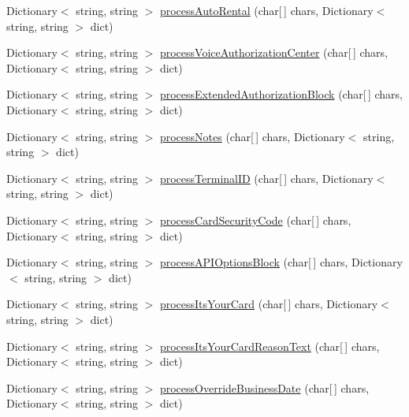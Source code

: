 \begin{DoxyCompactItemize}
\item 
Dictionary$<$ string, string $>$ \mbox{\hyperlink{class_form_sim_1_1_t_c_p_handler_a88eb6a78093ee2835b964fbf66653e7e}{process\+Auto\+Rental}} (char\mbox{[}$\,$\mbox{]} chars, Dictionary$<$ string, string $>$ dict)
\item 
Dictionary$<$ string, string $>$ \mbox{\hyperlink{class_form_sim_1_1_t_c_p_handler_a2c44efe0f4fd809a32174812bd2b7149}{process\+Voice\+Authorization\+Center}} (char\mbox{[}$\,$\mbox{]} chars, Dictionary$<$ string, string $>$ dict)
\item 
Dictionary$<$ string, string $>$ \mbox{\hyperlink{class_form_sim_1_1_t_c_p_handler_aeac1ea5fad517dbb64eae4c3039ea46f}{process\+Extended\+Authorization\+Block}} (char\mbox{[}$\,$\mbox{]} chars, Dictionary$<$ string, string $>$ dict)
\item 
Dictionary$<$ string, string $>$ \mbox{\hyperlink{class_form_sim_1_1_t_c_p_handler_ad4d752f756499196f766dc999f789fdb}{process\+Notes}} (char\mbox{[}$\,$\mbox{]} chars, Dictionary$<$ string, string $>$ dict)
\item 
Dictionary$<$ string, string $>$ \mbox{\hyperlink{class_form_sim_1_1_t_c_p_handler_a788a14473a58218eded09dcb8ab46fa3}{process\+Terminal\+ID}} (char\mbox{[}$\,$\mbox{]} chars, Dictionary$<$ string, string $>$ dict)
\item 
Dictionary$<$ string, string $>$ \mbox{\hyperlink{class_form_sim_1_1_t_c_p_handler_ab96b11e34b8e826ec6aa4644d413f85c}{process\+Card\+Security\+Code}} (char\mbox{[}$\,$\mbox{]} chars, Dictionary$<$ string, string $>$ dict)
\item 
Dictionary$<$ string, string $>$ \mbox{\hyperlink{class_form_sim_1_1_t_c_p_handler_a404ed1a6ccc26078fa89887505807598}{process\+A\+P\+I\+Options\+Block}} (char\mbox{[}$\,$\mbox{]} chars, Dictionary$<$ string, string $>$ dict)
\item 
Dictionary$<$ string, string $>$ \mbox{\hyperlink{class_form_sim_1_1_t_c_p_handler_a1957ee07ce1575f2e34669bff666dca1}{process\+Its\+Your\+Card}} (char\mbox{[}$\,$\mbox{]} chars, Dictionary$<$ string, string $>$ dict)
\item 
Dictionary$<$ string, string $>$ \mbox{\hyperlink{class_form_sim_1_1_t_c_p_handler_a6e499f837cfcf4ab08c81a3e14284087}{process\+Its\+Your\+Card\+Reason\+Text}} (char\mbox{[}$\,$\mbox{]} chars, Dictionary$<$ string, string $>$ dict)
\item 
Dictionary$<$ string, string $>$ \mbox{\hyperlink{class_form_sim_1_1_t_c_p_handler_a7e41880df196b83e6ea06d2551c4e230}{process\+Override\+Business\+Date}} (char\mbox{[}$\,$\mbox{]} chars, Dictionary$<$ string, string $>$ dict)

\end{DoxyCompactItemize}
